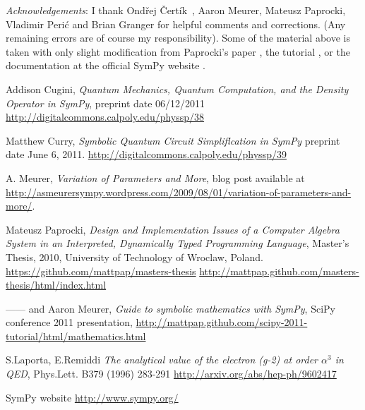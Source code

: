 \documentclass[12pt]{article}
\def\OC{Ond\v rej \v Cert\' ik\ }
\begin{document}
\vskip 0.3in

\noindent
{\it Acknowledgements}:
I thank \OC, Aaron Meurer, Mateusz Paprocki, Vladimir Peri\'c and Brian Granger  
for helpful comments and corrections. (Any remaining errors are of course my
responsibility). Some of the material above is taken 
with only slight modification from Paprocki's paper
\cite{P}, the tutorial \cite{PM}, or the documentation at the official SymPy website
\cite{S}.



\begin{thebibliography}{99}

Addison Cugini,
{\it Quantum Mechanics, Quantum Computation, and the Density Operator in SymPy},
preprint date 06/12/2011
\newline
\url{http://digitalcommons.calpoly.edu/physsp/38}

Matthew Curry,
{\it Symbolic Quantum Circuit Simpliflcation in SymPy}
preprint date June 6, 2011.
\newline
\url{http://digitalcommons.calpoly.edu/physsp/39}

 A. Meurer, 
{\it Variation of Parameters and More}, blog post available at
\newline
\url{http://asmeurersympy.wordpress.com/2009/08/01/variation-of-parameters-and-more/}.

Mateusz Paprocki,
{\it  Design and Implementation Issues of a Computer Algebra System 
in an Interpreted, Dynamically Typed Programming Language},
Master's Thesis, 2010, University of Technology of
Wroclaw,  Poland.
\newline
\url{https://github.com/mattpap/masters-thesis}
\newline
\url{http://mattpap.github.com/masters-thesis/html/index.html}

------ and Aaron Meurer,
{\it Guide to symbolic mathematics with SymPy},
SciPy conference 2011 presentation, 
\newline
\url{http://mattpap.github.com/scipy-2011-tutorial/html/mathematics.html}

S.Laporta, E.Remiddi
{\it The analytical value of the electron (g-2) at order $\alpha^3$ in QED},
Phys.Lett. B379 (1996) 283-291
\newline
\url{http://arxiv.org/abs/hep-ph/9602417}


  SymPy website
\newline
\url{http://www.sympy.org/}



\end{thebibliography}
\end{document}
